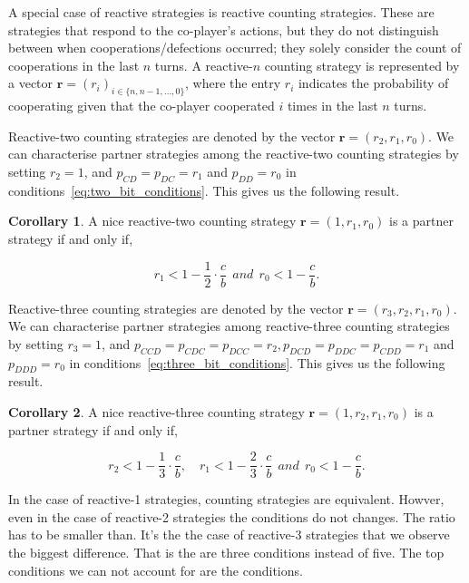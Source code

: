 \documentclass{article}
\theoremstyle{definition}
\newtheorem{corollary}{Corollary}[theorem]
\begin{document}
A special case of reactive strategies is reactive counting strategies. These are
strategies that respond to the co-player's actions, but they do not distinguish
between when cooperations/defections occurred; they solely consider the count of
cooperations in the last $n$ turns. A reactive-$n$ counting strategy is represented
by a vector $\mathbf{r}=(r_i)_{i \in \{n, n -1, \dots, 0\}}$, where the entry \(r_i\)
indicates the probability of cooperating given that the co-player cooperated
\(i\) times in the last \(n\) turns.

Reactive-two counting strategies are denoted by the vector $\mathbf{r}=(r_2,
r_1, r_0)$. We can characterise partner strategies among the reactive-two
counting strategies by setting $r_2 = 1$, and $p_{CD} = p_{DC} = r_1$ and
$p_{DD} = r_0$ in conditions~\eqref{eq:two_bit_conditions}. This gives us the
following result.

\begin{corollary}
A nice reactive-two counting strategy $\mathbf{r} = (1, r_1, r_0)$ is a partner strategy if and only if,

\begin{equation}\label{eq:counting_two_bit_conditions}
  \displaystyle r_1 < 1-\frac{1}{2} \cdot \frac{c}{b} ~~and~~ r_0 < 1\!-\! \frac{c}{b}.
\end{equation}
\end{corollary}

Reactive-three counting strategies are denoted by the vector $\mathbf{r}=(r_3,
r_2, r_1, r_0)$. We can characterise partner strategies among reactive-three
counting strategies by setting $r_3 = 1$, and $p_{CCD} = p_{CDC} = p_{DCC} =
r_2, p_{DCD} = p_{DDC} = p_{CDD} = r_1$ and $p_{DDD} = r_0$ in
conditions~\eqref{eq:three_bit_conditions}. This gives us the following result.

\begin{corollary}
A nice reactive-three counting strategy $\mathbf{r} = (1, r_2, r_1, r_0)$ is a partner strategy if and only if,

\begin{equation}\label{eq:counting_three_bit_conditions}
  \displaystyle r_2 < 1- \frac{1}{3} \cdot \frac{c}{b}, \quad r_1 < 1- \frac{2}{3} \cdot \frac{c}{b} ~~and~~ r_0 < 1\!-\! \frac{c}{b}.
\end{equation}
\end{corollary}

In the case of reactive-1 strategies, counting strategies are equivalent.
Howver, even in the case of reactive-2 strategies the conditions do not changes.
The ratio has to be smaller than. It's the the case of reactive-3 strategies
that we observe the biggest difference. That is the are three conditions instead
of five. The top conditions we can not account for are the conditions.
\end{document}
